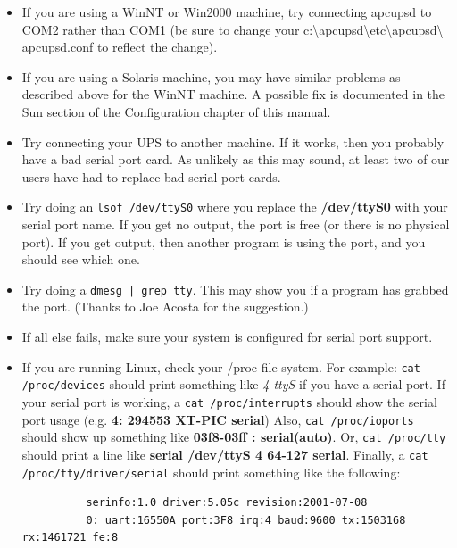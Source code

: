 {{{{{{{{{\begin{itemize}
Add the following to the end of the line: /NoSerialMice:COM1 (or COM2) so that
the new line looks like:  

\footnotesize
\begin{verbatim}
          multi(0)disk(0)rdisk(0)partition(1)\WINNT="Windows NT Workstation Version 4.00" /NoSerialMice:COM1
     
\end{verbatim}
\normalsize

\item If you are using a WinNT or Win2000 machine, try connecting apcupsd to
   COM2 rather than COM1 (be sure to change your
   c:\textbackslash{}apcupsd\textbackslash{}etc\textbackslash{}apcupsd\textbackslash
{}apcupsd.conf to reflect the change).  
\item If you are using a Solaris machine, you may have similar problems as
   described above for the WinNT machine. A possible fix is documented in the Sun
   section of the Configuration chapter of this manual.  
\item Try connecting your UPS to another machine. If it works, then you
   probably have a bad serial port card. As unlikely as this may sound, at least
   two of our users have had to replace bad serial port cards.  
\item Try doing an {\tt lsof /dev/ttyS0} where you replace the {\bf
   /dev/ttyS0} with your serial port name. If you get no output, the port is free
   (or there is no physical port). If you get output, then another program is
using the port, and you should see which one.  
\item Try doing a {\tt dmesg | grep tty}. This may show you if a program has
   grabbed the port. (Thanks to Joe Acosta for the suggestion.)  
\item If all else fails, make sure your system is configured for serial port
   support.  
\item If you are running Linux, check your /proc file system. For example:
   {\tt cat /proc/devices} should print something like {\it 4 ttyS} if you have a
   serial port. If your serial port is working, a {\tt cat /proc/interrupts}
should show the serial port usage (e.g. {\bf 4: 294553 XT-PIC serial}) Also,
{\tt cat /proc/ioports} should show up something like {\bf 03f8-03ff :
serial(auto)}. Or, {\tt cat /proc/tty} should print a line like {\bf serial
/dev/ttyS 4 64-127 serial}. Finally, a {\tt cat /proc/tty/driver/serial}
should print something like the following:  

\footnotesize
\begin{verbatim}
          serinfo:1.0 driver:5.05c revision:2001-07-08
          0: uart:16550A port:3F8 irq:4 baud:9600 tx:1503168 rx:1461721 fe:8
     

\end{verbatim}
\end{itemize}}}}}}}}}}
